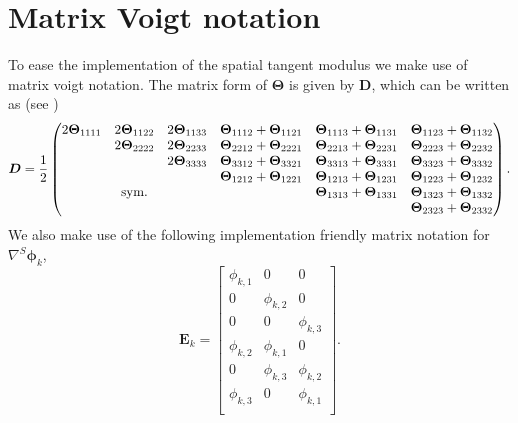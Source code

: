 \section{Matrix Voigt notation}
To ease the implementation of the spatial tangent modulus we make use of matrix voigt notation. The matrix form of $\mathbf{\Theta}$ is given by $\boldsymbol{D}$, which can be written as (see \cite[section 7.4.2]{bonet1997nonlinear})
\begin{equation}\boldsymbol{D}=\frac{1}{2}
\begin{pmatrix}
  2\boldsymbol{\Theta}_{1111}&2\boldsymbol{\Theta}_{1122}&2\boldsymbol{\Theta}_{1133}& \boldsymbol{\Theta}_{1112}+\boldsymbol{\Theta}_{1121}&\boldsymbol{\Theta}_{1113}+\boldsymbol{\Theta}_{1131}&\boldsymbol{\Theta}_{1123}+\boldsymbol{\Theta}_{1132}\\
      & 2\boldsymbol{\Theta}_{2222} & 2\boldsymbol{\Theta}_{2233}  &\boldsymbol{\Theta}_{2212}+\boldsymbol{\Theta}_{2221} &\boldsymbol{\Theta}_{2213}+\boldsymbol{\Theta}_{2231}& \boldsymbol{\Theta}_{2223}+\boldsymbol{\Theta}_{2232} \\
      &     & 2 \boldsymbol{\Theta}_{3333}  &  \boldsymbol{\Theta}_{3312}+\boldsymbol{\Theta}_{3321} & \boldsymbol{\Theta}_{3313}+\boldsymbol{\Theta}_{3331} & \boldsymbol{\Theta}_{3323}+\boldsymbol{\Theta}_{3332} \\
      &     &       & \boldsymbol{\Theta}_{1212}+\boldsymbol{\Theta}_{1221} & \boldsymbol{\Theta}_{1213}+\boldsymbol{\Theta}_{1231} & \boldsymbol{\Theta}_{1223} + \boldsymbol{\Theta}_{1232} \\
      &  \mbox{sym.}   &       &     & \boldsymbol{\Theta}_{1313}+\boldsymbol{\Theta}_{1331} & \boldsymbol{\Theta}_{1323}+\boldsymbol{\Theta}_{1332} \\
      &     &       &     &        & \boldsymbol{\Theta}_{2323} + \boldsymbol{\Theta}_{2332} \\
\end{pmatrix}.
\label{matrixvoigt}
\end{equation}
We also make use of the following implementation friendly matrix notation for $\nabla^{S}\boldsymbol{\phi}_{k}$,
\begin{equation}
\boldsymbol{E}_{k}=
 \begin{bmatrix}
       {\phi}_{k,1} & 0 & 0\\
       0 & {\phi}_{k,2} & 0\\
       0 & 0 & {\phi}_{k,3}\\
       \phi_{k,2} & \phi_{k,1} & 0\\
       0 & {\phi}_{k,3} & {\phi}_{k,2}\\
       {\phi}_{k,3} & 0 & {\phi}_{k,1}\\
      \end{bmatrix} .
 \label{eqn:sym_matrix}
\end{equation}

